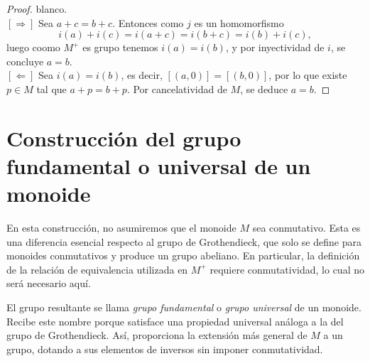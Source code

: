 \begin{proof}
	{\color{white} blanco.}\\
	
	\noindent \([ \Rightarrow ]\) Sea \(a + c = b + c\). Entonces como $j$ es un homomorfismo
	\[
	i(a) + i(c) = i(a + c) = i(b + c) = i(b) + i(c),
	\]
	luego coomo $M^{+}$ es grupo tenemos  \(i(a) = i(b)\), y por inyectividad de \(i\), se concluye \(a = b\).\\
	
	\noindent \([ \Leftarrow ]\) Sea \(i(a) = i(b)\), es decir, \([(a,0)] = [(b,0)]\), por lo que existe \(p \in M\) tal que \(a + p = b + p\). Por cancelatividad de \(M\), se deduce \(a = b\).
\end{proof}


\begin{observacion}
\end{observacion}













\section{Construcción del grupo fundamental o universal de un monoide}

En esta construcción, no asumiremos que el monoide \( M \) sea conmutativo. Esta es una diferencia esencial respecto al grupo de Grothendieck, que solo se define para monoides conmutativos y produce un grupo abeliano. En particular, la definición de la relación de equivalencia utilizada en \( M^+ \) requiere conmutatividad, lo cual no será necesario aquí.

\medskip
\noindent El grupo resultante se llama \emph{grupo fundamental} o \emph{grupo universal} de un monoide. Recibe este nombre porque satisface una propiedad universal análoga a la del grupo de Grothendieck. Así, proporciona la extensión más general de \( M \) a un grupo, dotando a sus elementos de inversos sin imponer conmutatividad.

